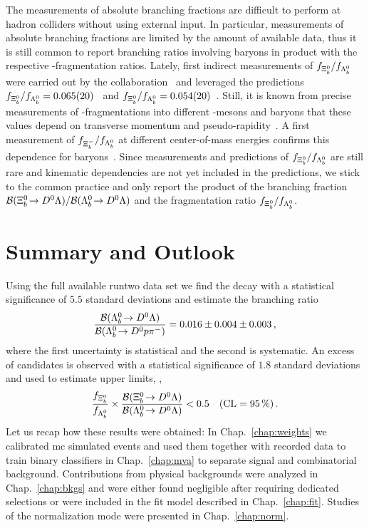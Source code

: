 The measurements of absolute branching fractions are difficult to perform at hadron colliders without using external input.
In particular, measurements of absolute \Xib branching fractions are limited by the amount of available data, thus it is still common to report branching ratios involving \Xib baryons in product with the respective \bquark-fragmentation ratios.
Lately, first indirect measurements of $f_{{{\Xi}^0_{b}}}/f_{{{\Lambda}^0_{b}}}$ were carried out by the \lhcb collaboration~\cite{fXibzfLb} and leveraged the predictions $f_{{{\Xi}^0_{b}}}/f_{{{\Lambda}^0_{b}}} = 0.065(20)$~\cite{fXibzfLb_theo1} and $f_{{{\Xi}^0_{b}}}/f_{{{\Lambda}^0_{b}}} = 0.054(20)$~\cite{fXibzfLb_theo2}.
Still, it is known from precise measurements of \bquark-fragmentations into different \bquark-mesons and \Lb baryons that these values depend on transverse momentum and pseudo-rapidity~\cite{LHCb_bProdFrac_7,LHCb_bProdFrac_13}.
A first measurement of $f_{{{\Xi}^-_{b}}}/f_{{{\Lambda}^0_{b}}}$ at different center-of-mass energies confirms this dependence for \Xib baryons~\cite{fXibmfLb}.
Since measurements and predictions of $f_{{{\Xi}^0_{b}}}/f_{{{\Lambda}^0_{b}}}$ are still rare and kinematic dependencies are not yet included in the predictions, we stick to the common practice and only report the product of the branching fraction ${\mathcal{B}}({{\Xi}^0_{b}}\!\rightarrow {\ensuremath{{D}^0}}{\ensuremath{\Lambda}}) / {\mathcal{B}}({{\Lambda}^0_{b}}\!\rightarrow {\ensuremath{{D}^0}}{\ensuremath{\Lambda}})$ and the fragmentation ratio $f_{{{\Xi}^0_{b}}}/f_{{{\Lambda}^0_{b}}}$.

\section{Summary and Outlook}
Using the full available \gls{runtwo} data set we find the decay \decay{\Lb}{\Dz\Lz} with a statistical significance of $5.5$ standard deviations and estimate the branching ratio
\begin{equation}
    \label{eq:br_Lbbr}
    \frac{{\mathcal{B}}({{\Lambda}^0_{b}}\!\rightarrow {\ensuremath{{D}^0}}{\ensuremath{\Lambda}})}{{\mathcal{B}}({{\Lambda}^0_{b}}\!\rightarrow {\ensuremath{{D}^0}}{\ensuremath{p}}{\ensuremath{{\pi}^-}})} = 0.016 \pm 0.004 \pm 0.003 \,,
\end{equation}
where the first uncertainty is statistical and the second is systematic.
An excess of \decay{\Xibz}{\Dz\Lz} candidates is observed with a statistical significance of $1.8$ standard deviations and used to estimate upper limits, \eg{},
\begin{equation}
    \label{eq:br_Xibzbr}
    \frac{f_{{{\Xi}^0_{b}}}}{f_{{{\Lambda}^0_{b}}}} \times \frac{{\mathcal{B}}({{\Xi}^0_{b}}\!\rightarrow {\ensuremath{{D}^0}}{\ensuremath{\Lambda}})}{{\mathcal{B}}({{\Lambda}^0_{b}}\!\rightarrow {\ensuremath{{D}^0}}{\ensuremath{\Lambda}})} < 0.5 \quad (\text{CL} = 95\,\%) \,.
\end{equation}
Let us recap how these results were obtained:
In Chap.~\ref{chap:weights} we calibrated \gls{mc} simulated events and used them together with recorded data to train binary classifiers in Chap.~\ref{chap:mva} to separate signal and combinatorial background.
Contributions from physical backgrounds were analyzed in Chap.~\ref{chap:bkgs} and were either found negligible after requiring dedicated selections or were included in the fit model described in Chap.~\ref{chap:fit}.
Studies of the normalization mode were presented in Chap.~\ref{chap:norm}.


